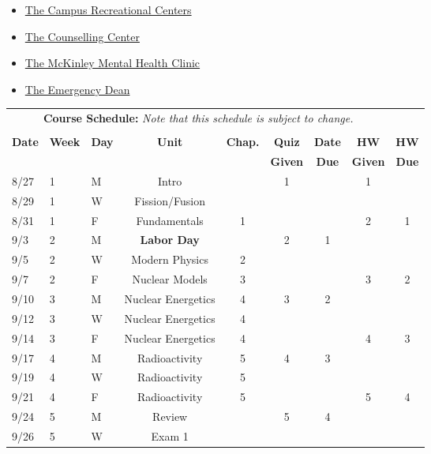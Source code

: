 \documentclass[11pt, a4paper]{article}
\begin{document}
\begin{itemize}
\item \href{https://campusrec.illinois.edu/}{The Campus Recreational Centers}
\item \href{http://counselingcenter.illinois.edu/}{The Counselling Center}
\item \href{http://www.mckinley.illinois.edu/clinics/mental\_health.htm}{The McKinley Mental Health Clinic}
\item \href{http://odos.illinois.edu/emergency/}{The Emergency Dean}
\end{itemize}

\pagebreak
\FloatBarrier
\renewcommand{\arraystretch}{1}
\begin{table}[h]
\begin{center}
\begin{tabular}{lllcccccc}
\multicolumn{8}{c}{\textbf{Course Schedule:}\textit{ Note that this schedule is 
subject to change.}}\\
&&&&&&&&\\
\textbf{Date} & \textbf{Week} & \textbf{Day} & \textbf{Unit} & \textbf{Chap.} & \textbf{Quiz}& \textbf{Date} & \textbf{HW} & \textbf{HW}\\
              &  &  &  &  & \textbf{Given} & \textbf{Due} & \textbf{Given} & \textbf{Due}\\ \hline
\hline
8/27 & 1 & M  & Intro &  & 1 &  & 1 & \\
8/29 & 1 & W & Fission/Fusion &  &  &  &  &  \\
8/31 & 1 & F & Fundamentals & 1 &  &  & 2 & 1 \\
9/3 & 2 & M & \textbf{Labor Day}  &  & 2 & 1 &  &  \\
9/5 & 2 & W & Modern Physics  & 2 &  &  &  &  \\
9/7 & 2 & F & Nuclear Models  & 3 &  &  & 3 & 2 \\
9/10 & 3 & M & Nuclear Energetics  & 4 & 3 & 2 &  &  \\
9/12 & 3 & W & Nuclear Energetics  & 4 &  &  &  &  \\
9/14 & 3 & F & Nuclear Energetics  & 4 &  &  & 4 & 3 \\
9/17 & 4 & M & Radioactivity  & 5 & 4 & 3 &  &  \\
9/19 & 4 & W & Radioactivity  & 5 &  &  &  &  \\
9/21 & 4 & F & Radioactivity  & 5 &  &  & 5 & 4 \\
9/24 & 5 & M & Review  &  & 5 & 4 &  &  \\
9/26 & 5 & W & Exam 1  &  &  &  &  &  \\

\end{tabular}
\end{center}
\end{table}
\end{document}
